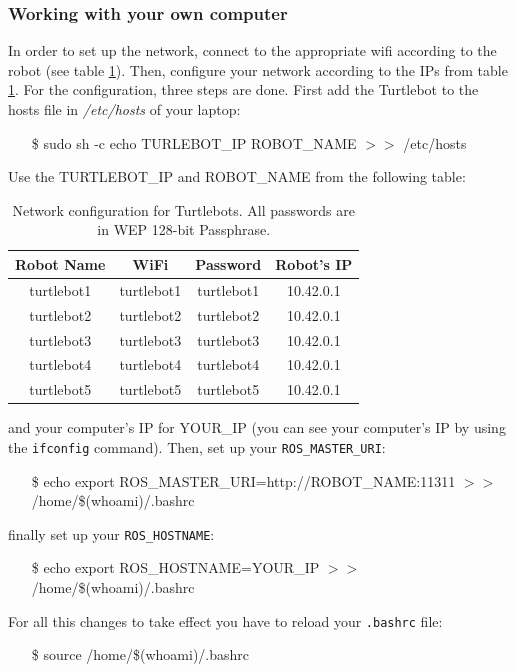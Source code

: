 \documentclass[a4paper,10pt]{article}
\begin{document}
\subsubsection{Working with your own computer}
In order to set up the network, connect to the appropriate wifi according to the robot (see table \ref{tab:ips}). Then, configure your network according to the IPs from table \ref{tab:ips}. For the configuration, three steps are done. First add the Turtlebot to the hosts file in \textit{/etc/hosts} of your laptop: 
\begin{shaded}
	\begin{itemize}
		\item[\$] sudo sh -c \textquotesingle echo TURLEBOT\_IP  ROBOT\_NAME $>>$ /etc/hosts\textquotesingle
	\end{itemize}
\end{shaded}
Use the TURTLEBOT\_IP and ROBOT\_NAME from the following table:

\begin{table}[h!]
	\centering
	\begin{tabular}{|c|c|c|c|}
		\hline
		Robot Name & WiFi & Password & Robot's IP \\ \hline
		turtlebot1 & turtlebot1 & turtlebot1 & 10.42.0.1 \\ \hline
		turtlebot2 & turtlebot2 & turtlebot2 & 10.42.0.1 \\ \hline
		turtlebot3 & turtlebot3 & turtlebot3 & 10.42.0.1 \\ \hline
		turtlebot4 & turtlebot4 & turtlebot4 & 10.42.0.1 \\ \hline
		turtlebot5 & turtlebot5 & turtlebot5 & 10.42.0.1 \\ \hline
	\end{tabular}
    \caption{Network configuration for Turtlebots. All passwords are in WEP 128-bit Passphrase. }
    \label{tab:ips}
\end{table}
and your computer's IP for YOUR\_IP (you can see your computer's IP by using the \texttt{ifconfig} command). Then, set up your \texttt{ROS\_MASTER\_URI}:
\begin{shaded}
	\begin{itemize}
		\item[\$] echo export ROS\_MASTER\_URI=http://ROBOT\_NAME:11311 $>>$ /home/\$(whoami)/.bashrc
	\end{itemize}
\end{shaded}
finally set up your \texttt{ROS\_HOSTNAME}:
\begin{shaded}
	\begin{itemize}
		\item[\$] echo export ROS\_HOSTNAME=YOUR\_IP $>>$ /home/\$(whoami)/.bashrc
	\end{itemize}
\end{shaded}
For all this changes to take effect you have to reload your \texttt{.bashrc} file:
\begin{shaded}
	\begin{itemize}
		\item[\$] source /home/\$(whoami)/.bashrc
	\end{itemize}
\end{shaded}
\end{document}
